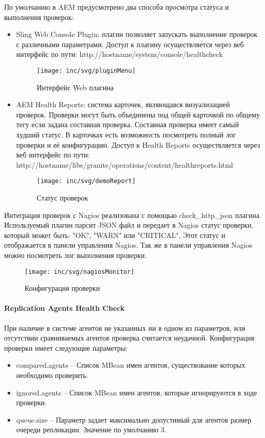 По умолчанию в AEM предусмотрено два способа просмотра статуса и выполнения проверок:
\begin{itemize}
	\item Sling Web Console Plugin: плагин позволяет запускать выполнение проверок с различными параметрами. Доступ к плагину осуществляется через веб интерфейс по пути: http://hostname/system/console/healthcheck 
\begin{figure}[H]
  \centering
  \texttt{[image: inc/svg/pluginMenu]}
  \caption{Интерфейс Web плагина}
  \label{fig:pluginMenu}
\end{figure}
	\item AEM Health Reports: система карточек, являющаяся визуализацией проверок. Проверки могут быть объединены под общей карточкой по общему тегу если задана составная проверка. Составная проверка имеет самый худший статус. В карточках есть возможность посмотреть полный лог проверки и её конфигурацию. Доступ к Health Reports осуществляется через веб интерфейс по пути: http://hostname/libs/granite/operations/content/healthreports.html
\begin{figure}[H]
  \centering
  \texttt{[image: inc/svg/demoReport]}
  \caption{Статус проверок}
  \label{fig:demoReport}
\end{figure}
\end{itemize}
		
Интеграция проверок с Nagios реализована с помощью check\_http\_json плагина. Используемый плагин парсит JSON файл и передает в Nagios статус проверки, который может быть: "OK", "WARN" или "CRITICAL". Этот статус и отображается в панели управления Nagios. Так же в панели управления Nagios можно посмотреть лог выполнения проверки.
\begin{figure}[H]
  \centering
  \texttt{[image: inc/svg/nagiosMonitor]}
  \caption{Конфигурация проверки}
  \label{fig:nagiosMonitor}
\end{figure}

\paragraph{Replication Agents Health Check}
При наличие в системе агентов не указанных ни в одном из параметров, или отсутствии сравниваемых агентов проверка считается неудачной.
Конфигурация проверки имеет следующие параметры:
\begin{itemize}
\item compared.agents – Список MBean имен агентов, существование которых необходимо проверить.
\item ignored.agents – Список MBean имен агентов, которые игнорируются в ходе проверки.
\item queue.size – Параметр задает максимально допустимый для агентов размер очереди репликации. Значение по умолчанию 3.
\end{itemize}

